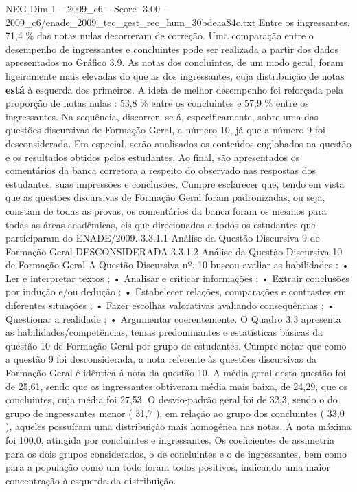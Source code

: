 \begin{textsample}{NEG Dim 1 – 2009\_c6 – Score -3.00 – 2009\_c6/enade\_2009\_tec\_gest\_rec\_hum\_30bdeaa84c.txt}
Entre os ingressantes, 71,4 \% das notas nulas decorreram de correção.
Uma comparação entre o desempenho de ingressantes e concluintes pode ser realizada a partir dos dados apresentados no Gráfico 3.9.
As notas dos concluintes, de um modo geral, foram ligeiramente mais elevadas do que as dos ingressantes, cuja distribuição de notas \textbf{está} à esquerda dos primeiros.
A ideia de melhor desempenho foi reforçada pela proporção de notas nulas : 53,8 \% entre os concluintes e 57,9 \% entre os ingressantes.
Na sequência, discorrer -se-á, especificamente, sobre uma das questões discursivas de Formação Geral, a número 10, já que a número 9 foi desconsiderada.
Em especial, serão analisados os conteúdos englobados na questão e os resultados obtidos pelos estudantes.
Ao final, são apresentados os comentários da banca corretora a respeito do observado nas respostas dos estudantes, suas impressões e conclusões.
Cumpre esclarecer que, tendo em vista que as questões discursivas de Formação Geral foram padronizadas, ou seja, constam de todas as provas, os comentários da banca foram os mesmos para todas as áreas acadêmicas, eis que direcionados a todos os estudantes que participaram do ENADE/2009. 3.3.1.1 Análise da Questão Discursiva 9 de Formação Geral DESCONSIDERADA 3.3.1.2 Análise da Questão Discursiva 10 de Formação Geral A Questão Discursiva nº. 10 buscou avaliar as habilidades : • Ler e interpretar textos ; • Analisar e criticar informações ; • Extrair conclusões por indução e/ou dedução ; • Estabelecer relações, comparações e contrastes em diferentes situações ; • Fazer escolhas valorativas avaliando consequências ; • Questionar a realidade ; • Argumentar coerentemente.
O Quadro 3.3 apresenta as habilidades/competências, temas predominantes e estatísticas básicas da questão 10 de Formação Geral por grupo de estudantes.
Cumpre notar que como a questão 9 foi desconsiderada, a nota referente às questões discursivas da Formação Geral é idêntica à nota da questão 10.
A média geral desta questão foi de 25,61, sendo que os ingressantes obtiveram média mais baixa, de 24,29, que os concluintes, cuja média foi 27,53.
O desvio-padrão geral foi de 32,3, sendo o do grupo de ingressantes menor ( 31,7 ), em relação ao grupo dos concluintes ( 33,0 ), aqueles possuíram uma distribuição mais homogênea nas notas.
A nota máxima foi 100,0, atingida por concluintes e ingressantes.
Os coeficientes de assimetria para os dois grupos considerados, o de concluintes e o de ingressantes, bem como para a população como um todo foram todos positivos, indicando uma maior concentração à esquerda da distribuição.

\end{textsample}
